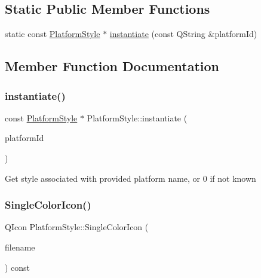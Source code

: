 \subsection*{Static Public Member Functions}
\begin{DoxyCompactItemize}
\item 
static const \mbox{\hyperlink{class_platform_style}{Platform\+Style}} $\ast$ \mbox{\hyperlink{class_platform_style_ab55b9c4d135bfddc4494f6eaac26becf}{instantiate}} (const Q\+String \&platform\+Id)
\end{DoxyCompactItemize}


\subsection{Member Function Documentation}
\mbox{\label{class_platform_style_ab55b9c4d135bfddc4494f6eaac26becf}} 
\subsubsection{\texorpdfstring{instantiate()}{instantiate()}}
{\footnotesize\ttfamily const \mbox{\hyperlink{class_platform_style}{Platform\+Style}} $\ast$ Platform\+Style\+::instantiate (\begin{DoxyParamCaption}\item[{const Q\+String \&}]{platform\+Id }\end{DoxyParamCaption})\hspace{0.3cm}{\ttfamily [static]}}

Get style associated with provided platform name, or 0 if not known \mbox{\label{class_platform_style_a3f4ff8b7a2054cbd4283e67208523035}} 
\subsubsection{\texorpdfstring{SingleColorIcon()}{SingleColorIcon()}\hspace{0.1cm}{\footnotesize\ttfamily [1/2]}}
{\footnotesize\ttfamily Q\+Icon Platform\+Style\+::\+Single\+Color\+Icon (\begin{DoxyParamCaption}\item[{const Q\+String \&}]{filename }\end{DoxyParamCaption}) const}

